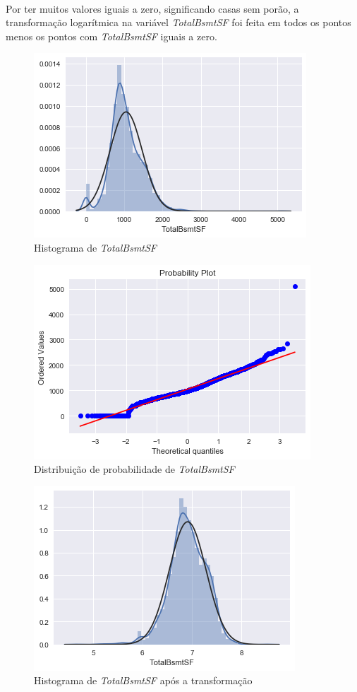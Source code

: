 \documentclass{article}
\begin{document}
			\paragraph{}Por ter muitos valores iguais a zero, significando casas sem porão, a transformação logarítmica na variável \textit{TotalBsmtSF} foi feita em todos os pontos menos os pontos com \textit{TotalBsmtSF} iguais a zero.
			
			\begin{figure}[H]
				\centering
				\includegraphics[scale=0.8]{../img/totalbsmtsf_norm_1}
				\caption{Histograma de \textit{TotalBsmtSF}}
			\end{figure}
			
			\begin{figure}[H]
				\centering
				\includegraphics[scale=0.8]{../img/totalbsmtsf_norm_2}
				\caption{Distribuição de probabilidade de \textit{TotalBsmtSF}}
			\end{figure}
			
			\begin{figure}[H]
				\centering
				\includegraphics[scale=0.8]{../img/totalbsmtsf_norm_after_1}
				\caption{Histograma de \textit{TotalBsmtSF} após a transformação}
			\end{figure}
			
\end{document}
